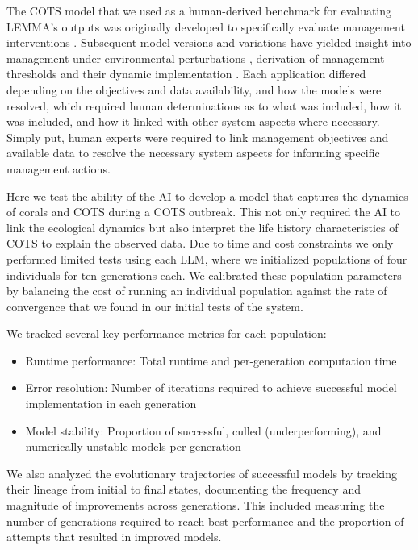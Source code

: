 The COTS model that we used as a human-derived benchmark for evaluating LEMMA's outputs was originally developed to specifically evaluate management interventions \citep{morello2014model}. Subsequent model versions and variations have yielded insight into management under environmental perturbations \citep{Rogers_Plaganyi_2022,Condie_Anthony_Babcock_Baird_Beeden_Fletcher_Gorton_Harrison_Hobday_Plaganyi_et_al_2021}, derivation of management thresholds \citep{plaganyi2020ecological,rogers2024validating} and their dynamic implementation \citep{rogers2023improving}. Each application differed depending on the objectives and data availability, and how the models were resolved, which required human determinations as to what was included, how it was included, and how it linked with other system aspects where necessary. Simply put, human experts were required to link management objectives and available data to resolve the necessary system aspects for informing specific management actions. 

Here we test the ability of the AI to develop a model that captures the dynamics of corals and COTS during a COTS outbreak. This not only required the AI to link the ecological dynamics but also interpret the life history characteristics of COTS to explain the observed data. Due to time and cost constraints we only performed limited tests using each LLM, where we initialized populations of four individuals for ten generations each. We calibrated these population parameters by balancing the cost of running an individual population against the rate of convergence that we found in our initial tests of the system.

We tracked several key performance metrics for each population:
\begin{itemize}
    \item Runtime performance: Total runtime and per-generation computation time
    \item Error resolution: Number of iterations required to achieve successful model implementation in each generation
    \item Model stability: Proportion of successful, culled (underperforming), and numerically unstable models per generation
\end{itemize}

We also analyzed the evolutionary trajectories of successful models by tracking their lineage from initial to final states, documenting the frequency and magnitude of improvements across generations. This included measuring the number of generations required to reach best performance and the proportion of attempts that resulted in improved models.



